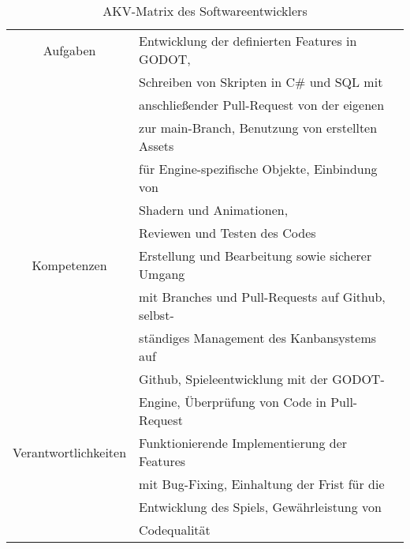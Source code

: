 \begin{table}[H]
    \begin{center}
        \label{tab:softwareentwickler}
        \begin{tabular}{|c||p{9cm}|}
            \hline
            Aufgaben & Entwicklung der definierten Features in GODOT, \\
            & Schreiben von Skripten in C\# und SQL mit \\
            & anschließender Pull-Request von der eigenen \\
            & zur main-Branch, Benutzung von erstellten Assets\\
            & für Engine-spezifische Objekte, Einbindung von \\
            & Shadern und Animationen, \\
            & Reviewen und Testen des Codes \\
            \hline
            Kompetenzen & Erstellung und Bearbeitung sowie sicherer Umgang \\
            & mit Branches und Pull-Requests auf Github, selbst- \\
            & ständiges Management des Kanbansystems auf \\
            & Github, Spieleentwicklung mit der GODOT- \\
            & Engine, Überprüfung von Code in Pull-Request \\
            \hline
            Verantwortlichkeiten & Funktionierende Implementierung der Features \\
            & mit Bug-Fixing, Einhaltung der Frist für die \\
            & Entwicklung des Spiels, Gewährleistung von \\
            & Codequalität \\
            \hline
        \end{tabular}
        \caption{AKV-Matrix des Softwareentwicklers}
    \end{center}
\end{table}
